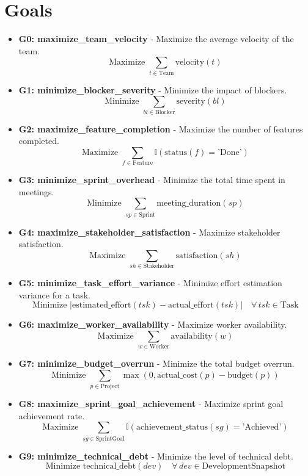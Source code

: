 \documentclass[11pt]{article}
\begin{document}
\section{Goals}
\begin{itemize}
    \item \textbf{G0: maximize\_team\_velocity} - Maximize the average velocity of the team.
        \[ \text{Maximize } \sum_{t \in \text{Team}} \text{velocity}(t) \]
    \item \textbf{G1: minimize\_blocker\_severity} - Minimize the impact of blockers.
        \[ \text{Minimize } \sum_{bl \in \text{Blocker}} \text{severity}(bl) \]
    \item \textbf{G2: maximize\_feature\_completion} - Maximize the number of features completed.
        \[ \text{Maximize } \sum_{f \in \text{Feature}} \mathbb{I}(\text{status}(f) = \text{'Done'}) \]
    \item \textbf{G3: minimize\_sprint\_overhead} - Minimize the total time spent in meetings.
        \[ \text{Minimize } \sum_{sp \in \text{Sprint}} \text{meeting\_duration}(sp) \]
    \item \textbf{G4: maximize\_stakeholder\_satisfaction} - Maximize stakeholder satisfaction.
        \[ \text{Maximize } \sum_{sh \in \text{Stakeholder}} \text{satisfaction}(sh) \]
    \item \textbf{G5: minimize\_task\_effort\_variance} - Minimize effort estimation variance for a task.
        \[ \text{Minimize } |\text{estimated\_effort}(tsk) - \text{actual\_effort}(tsk)| \quad \forall \, tsk \in \text{Task} \]
    \item \textbf{G6: maximize\_worker\_availability} - Maximize worker availability.
        \[ \text{Maximize } \sum_{w \in \text{Worker}} \text{availability}(w) \]
    \item \textbf{G7: minimize\_budget\_overrun} - Minimize the total budget overrun.
        \[ \text{Minimize } \sum_{p \in \text{Project}} \max(0, \text{actual\_cost}(p) - \text{budget}(p)) \]
    \item \textbf{G8: maximize\_sprint\_goal\_achievement} - Maximize sprint goal achievement rate.
        \[ \text{Maximize } \sum_{sg \in \text{SprintGoal}} \mathbb{I}(\text{achievement\_status}(sg) = \text{'Achieved'}) \]
    \item \textbf{G9: minimize\_technical\_debt} - Minimize the level of technical debt.
        \[ \text{Minimize } \text{technical\_debt}(dev) \quad \forall \, dev \in \text{DevelopmentSnapshot} \]
\end{itemize}
\end{document}
